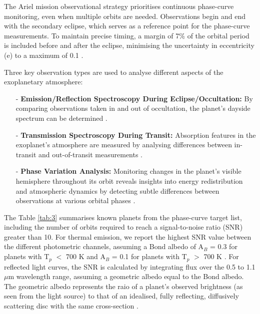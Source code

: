 \documentclass[12pt]{article}
\begin{document}
The Ariel mission observational strategy prioritises continuous phase-curve monitoring, even when multiple orbits are needed. Observations begin and end with the secondary eclipse, which serves as a reference point for the phase-curve measurements.
To maintain precise timing, a margin of 7\% of the orbital period is included before and after the eclipse, minimising the uncertainty in eccentricity (e) to a maximum of 0.1 \cite{salvignol2024ariel}.

Three key observation types are used to analyse different aspects of the exoplanetary atmosphere:

\begin{itemize}
    \item[-] \textbf{Emission/Reflection Spectroscopy During Eclipse/Occultation:} By comparing observations taken in and out of occultation, the planet's dayside spectrum can be determined \cite{salvignol2024ariel}.
    \item[-] \textbf{Transmission Spectroscopy During Transit:} Absorption features in the exoplanet's atmosphere are measured by analysing differences between in-transit and out-of-transit measurements \cite{salvignol2024ariel}.
    \item[-] \textbf{Phase Variation Analysis:} Monitoring changes in the planet's visible hemisphere throughout its orbit reveals insights into energy redistribution and atmospheric dynamics by detecting subtle differences between observations at various orbital phases \cite{salvignol2024ariel}.
\end{itemize}

The Table \ref{tab:3} summarises known planets from the phase-curve target list, including the number of orbits required to reach a signal-to-noise ratio (SNR) greater than 10. For thermal emission,
we report the highest SNR value between the different photometric channels, assuming a Bond albedo of A$_B$ = 0.3 for planets with T$_p$ $<$ 700 K and A$_B$ = 0.1 for planets with T$_p$ $>$ 700 K \cite{salvignol2024ariel}. 
For reflected light curves, the SNR is calculated by integrating flux over the 0.5 to 1.1 $\mu$m wavelength range, assuming a geometric albedo equal to the Bond albedo. The geometric albedo represents the raio of a planet's observed brightness (as seen from the light source) to that of an idealised,
fully reflecting, diffusively scattering disc with the same cross-section \cite{salvignol2024ariel}.
\end{document}
